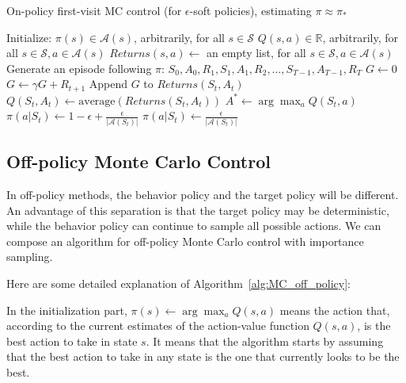\begin{algorithm}
    \caption{On-policy first-visit MC control (for $\epsilon$-soft policies), estimating $\pi \approx \pi_*$}\label{alg:MC_on_policy}
    \begin{algorithmic}
        \State Initialize:
        \State \hspace{\algorithmicindent} $\pi(s) \in \mathcal{A}(s)$, arbitrarily, for all $s \in \mathcal{S}$
        \State \hspace{\algorithmicindent} $Q(s,a) \in \mathbb{R}$, arbitrarily, for all $s \in \mathcal{S}, a \in \mathcal{A}(s)$
        \State \hspace{\algorithmicindent} $Returns(s,a) \leftarrow$ an empty list, for all $s \in \mathcal{S}, a \in \mathcal{A}(s)$
        \State Generate an episode following $\pi$: $S_0, A_0, R_1, S_1, A_1, R_2, \dots, S_{T-1}, A_{T-1}, R_T$
        \State $G \leftarrow 0$
        \State $G \leftarrow \gamma G + R_{t+1}$
        \State Append $G$ to $Returns(S_t, A_t)$
        \State $Q(S_t, A_t) \leftarrow \text{average}(Returns(S_t, A_t))$
        \State $A^* \leftarrow \arg\max_a Q(S_t, a)$
        \State $\pi(a|S_t) \leftarrow 1 - \epsilon + \frac{\epsilon}{|\mathcal{A}(S_t)|}$
        \Else
        \State $\pi(a|S_t) \leftarrow \frac{\epsilon}{|\mathcal{A}(S_t)|}$
        \EndIf
        \EndFor
        \EndIf
        \EndFor
        \EndLoop
    \end{algorithmic}
\end{algorithm}

\subsection{Off-policy Monte Carlo Control}

In off-policy methods, the behavior policy and the target policy will be different. An advantage of this separation is that the target policy may be deterministic, while the behavior policy can continue to sample all possible actions. We can compose an algorithm for off-policy Monte Carlo control with importance sampling.

Here are some detailed explanation of Algorithm~\ref{alg:MC_off_policy}:

In the initialization part, $\pi(s) \leftarrow \arg\max_a Q(s,a)$ means the action that, according to the current estimates of the action-value function $Q(s,a)$, is the best action to take in state $s$. It means that the algorithm starts by assuming that the best action to take in any state is the one that currently looks to be the best.

